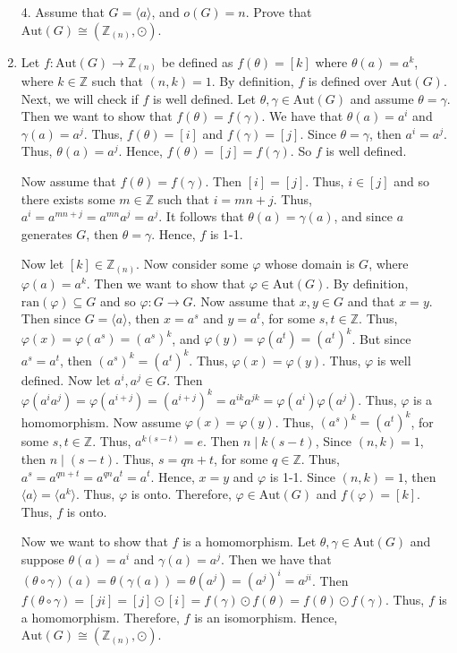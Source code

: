 \documentclass[12pt]{article}
\makeatletter
\theoremstyle{definition}
\theoremstyle{remark}
\renewenvironment{proof}[1][\proofname]{\par
  \pushQED{\qed}%
  \normalfont \topsep6\p@\@plus6\p@\relax
  \list{}{\leftmargin=0mm
          \rightmargin=4mm
          \settowidth{\itemindent}{\itshape#1}%
          \labelwidth=\itemindent
          \parsep=0pt \listparindent=\parindent 
  }
  \item[\hskip\labelsep
        \itshape
    #1\@addpunct{.}]\ignorespaces
}{%
  \popQED\endlist\@endpefalse
}
\let\oldproofname=\proofname
\renewcommand{\proofname}{\bf{\textit{\oldproofname}}}
\makeatother
\begin{document}
\begin{enumerate}[leftmargin=*]
    \item[4.] Assume that $G=\langle a\rangle$, and $o(G)=n$. Prove that $\text{Aut}(G)\cong (\mathbb{Z}_{(n)},\odot)$.
        \begin{proof}
            Let $f\colon\text{Aut}(G)\rightarrow\mathbb{Z}_{(n)}$ be defined as $f(\theta)=[k]$ where $\theta(a)=a^k$, where $k\in\mathbb{Z}$ such that $(n,k)=1$. By definition, $f$ is defined over Aut$(G)$. Next, we will check if $f$ is well defined. Let $\theta,\gamma\in\text{Aut}(G)$ and assume $\theta=\gamma$. Then we want to show that $f(\theta)=f(\gamma)$. We have that $\theta(a)=a^i$ and $\gamma(a)=a^j$. Thus, $f(\theta)=[i]$ and $f(\gamma)=[j]$. Since $\theta=\gamma$, then $a^i=a^j$. Thus, $\theta(a)=a^j$. Hence, $f(\theta)=[j]=f(\gamma)$. So $f$ is well defined.\par\hspace{4mm} Now assume that $f(\theta)=f(\gamma)$. Then $[i]=[j]$. Thus, $i\in[j]$ and so there exists some $m\in\mathbb{Z}$ such that $i=mn+j$. Thus, $a^{i}=a^{mn+j}=a^{mn}a^j=a^j$. It follows that $\theta(a)=\gamma(a)$, and since $a$ generates $G$, then $\theta=\gamma$. Hence, $f$ is 1-1.\par\hspace{4mm} Now let $[k]\in\mathbb{Z}_{(n)}$. Now consider some $\varphi$ whose domain is $G$, where $\varphi(a)=a^k$. Then we want to show that $\varphi\in\text{Aut}(G)$. By definition, $\text{ran}(\varphi)\subseteq G$ and so $\varphi\colon G\rightarrow G$. Now assume that $x,y\in G$ and that $x=y$. Then since $G=\langle a\rangle$, then $x=a^s$ and $y=a^t$, for some $s,t\in\mathbb{Z}$. Thus, $\varphi(x)=\varphi(a^s)=(a^s)^k$, and $\varphi(y)=\varphi(a^t)=(a^t)^k$. But since $a^s=a^t$, then $(a^s)^k=(a^t)^k$. Thus, $\varphi(x)=\varphi(y)$. Thus, $\varphi$ is well defined. Now let $a^i,a^j\in G$. Then $\varphi(a^ia^j)=\varphi(a^{i+j})=(a^{i+j})^k=a^{ik}a^{jk}=\varphi(a^i)\varphi(a^j)$. Thus, $\varphi$ is a homomorphism. Now assume $\varphi(x)=\varphi(y)$. Thus, $(a^s)^k=(a^t)^k$, for some $s,t\in\mathbb{Z}$. Thus, $a^{k(s-t)}=e$. Then $n\mid k(s-t)$, Since $(n,k)=1$, then $n\mid(s-t)$. Thus, $s=qn+t$, for some $q\in\mathbb{Z}$. Thus, $a^s=a^{qn+t}=a^{qn}a^t=a^t$. Hence, $x=y$ and $\varphi$ is 1-1. Since $(n,k)=1$, then $\langle a\rangle=\langle a^k\rangle$. Thus, $\varphi$ is onto. Therefore, $\varphi\in\text{Aut}(G)$ and $f(\varphi)=[k]$. Thus, $f$ is onto.\par\hspace{4mm} Now we want to show that $f$ is a homomorphism. Let $\theta,\gamma\in\text{Aut}(G)$ and suppose $\theta(a)=a^i$ and $\gamma(a)=a^j$. Then we have that $(\theta\circ\gamma)(a)=\theta(\gamma(a))=\theta(a^j)=(a^j)^i=a^{ji}$. Then $f(\theta\circ\gamma)=[ji]=[j]\odot[i]=f(\gamma)\odot f(\theta)=f(\theta)\odot f(\gamma)$. Thus, $f$ is a homomorphism. Therefore, $f$ is an isomorphism. Hence, $\text{Aut}(G)\cong(\mathbb{Z}_{(n)},\odot)$. 
        \end{proof}
        

\end{enumerate}
\end{document}
